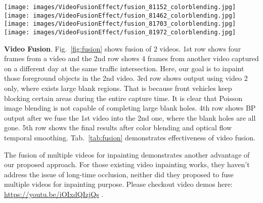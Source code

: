 \documentclass[runningheads]{llncs}
\begin{document}
\begin{figure*}
    \begin{minipage}{\textwidth}
    \centering
    \texttt{[image: images/VideoFusionEffect/fusion\_81152\_colorblending.jpg]}\hspace{-0.06 cm}
    \texttt{[image: images/VideoFusionEffect/fusion\_81462\_colorblending.jpg]}\hspace{-0.06 cm}
    \texttt{[image: images/VideoFusionEffect/fusion\_81703\_colorblending.jpg]}\hspace{-0.06 cm}
    \texttt{[image: images/VideoFusionEffect/fusion\_81972\_colorblending.jpg]}
    \end{minipage}

\caption{\textbf{1st row}: frames from video 1; \textbf{2nd row}: frames from video 2 captured on a different day; \textbf{3rd row}: results after Poisson color blending using video 2 only; \textbf{4th row}: direct inpainting results by fusing both videos; \textbf{5th row}: results after Poision color blending using both videos.}
\label{fig:fusion}
\end{figure*}


\textbf{Video Fusion}. Fig.~\ref{fig:fusion} shows fusion of 2 videos. 1st row shows four frames from a video and the 2nd row shows 4 frames from another video captured on a different day at the same traffic intersection. Here, our goal is to inpaint those foreground objects in the 2nd video. 3rd row shows output using video 2 only, where exists large blank regions. That is because front vehicles keep blocking certain areas during the entire capture time. It is clear that Poisson image blending is not capable of completing large blank holes. 4th row shows BP output after we fuse the 1st video into the 2nd one, where the blank holes are all gone. 5th row shows the final results after color blending and optical flow temporal smoothing. Tab.~\ref{tab:fusion} demonstrates effectiveness of video fusion.



The fusion of multiple videos for inpainting demonstrates another advantage of our proposed approach. For those existing video inpainting works, they haven't address the issue of long-time occlusion, neither did they proposed to fuse multiple videos for inpainting purpose. Please checkout video demos here: \url{https://youtu.be/iOIxdQIzjQs} .
\end{document}
